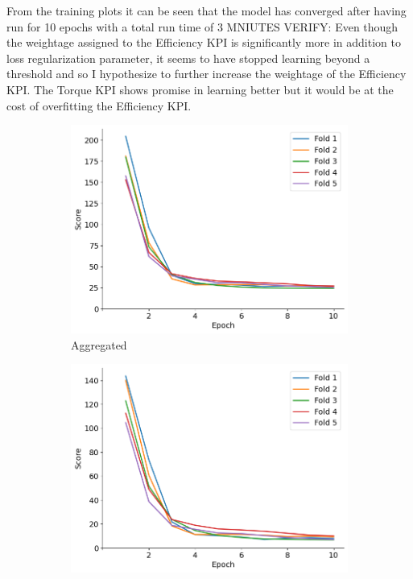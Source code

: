 \documentclass{report} %
\begin{document}
From the training plots it can be seen that the model has converged after having run for 10 epochs with a total run time of 3 MNIUTES VERIFY:
Even though the weightage assigned to the Efficiency \ac{KPI} is significantly more in addition to loss regularization parameter, it seems to have stopped learning 
beyond a threshold and so I hypothesize to further increase the weightage of the Efficiency \ac{KPI}.
The Torque \ac{KPI} shows promise in learning better but it would be at the cost of overfitting the Efficiency \ac{KPI}.
\begin{figure}[H]
    \centering
    \begin{subfigure}{0.32\textwidth}
        \centering
        \includegraphics[width=\textwidth]{./ReportImages/val_score.png}
        \caption{\centering Aggregated}
        \label{fig:Aggregated Validation Score}
    \end{subfigure}\hfill
    \begin{subfigure}{0.32\textwidth}
        \centering
        \includegraphics[width=\textwidth]{./ReportImages/val_score_y1.png}

\end{subfigure}
\end{figure}
\end{document}
